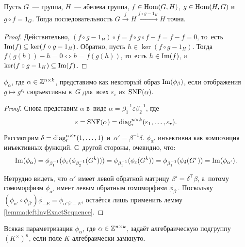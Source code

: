 \documentclass{article}
\begin{document}
\begin{lemma}
\label{lemma:leftInvExactSequence}
    Пусть $G$~— группа, $H$~— абелева группа, $f \in \mathrm{Hom}(G, H)$, $g \in \mathrm{Hom}(H, G)$ и~$g \circ f = 1_G$.
    Тогда последовательность $G \xrightarrow[]{f} H \xrightarrow[]{f \circ g - 1_H} H$ точна.
\end{lemma}

\begin{proof}
    Действительно, $(f \circ g - 1_H) \circ f = f \circ g \circ f - f = f - f = 0$, то~есть $\mathrm{Im}(f) \subseteq \ker(f \circ g - 1_H)$. 
    Обратно, пусть $h \in \ker(f \circ g - 1_H)$. Тогда $f(g(h)) - h = 0 \Leftrightarrow h = f(g(h))$, то~есть $h \in \mathrm{Im}(f)$,
    и~$\ker(f \circ g - 1_H) \subseteq \mathrm{Im}(f)$.
\end{proof}

\begin{lemma}
    $\phi_\alpha$, где $\alpha \in \mathbb{Z}^{n \times k}$, представимо как некоторый образ $\mathrm{Im}(\phi_\beta)$,
    если отображения $g \mapsto g^{\varepsilon_i}$ сюръективны в~$G$ для~всех $\varepsilon_i$ из~$\mathrm{SNF}(\alpha)$.
\end{lemma}

\begin{proof}
    Снова представим $\alpha$ в~виде $\alpha = \beta_1^{-1} \varepsilon \beta_2^{-1}$, где
    $$
        \varepsilon = \mathrm{SNF}(\alpha) = \mathrm{diag}^{n \times k}_r(\varepsilon_1, \ldots, \varepsilon_r).
    $$

    Рассмотрим $\delta = \mathrm{diag}^{n \times r}_r(1, \ldots, 1)$ и~$\alpha' = \beta^{-1} \delta$.
    $\phi_{\alpha'}$ инъективна как композиция инъективных функций. С~другой стороны, очевидно, что:
    $$
        \mathrm{Im}(\phi_\alpha) = \phi_{\beta_1^{-1}} (\phi_\varepsilon (\phi_{\beta_2^{-1}} (G^k)))
                            = \phi_{\beta_1^{-1}} (\phi_\varepsilon (G^k))
                            = \phi_{\beta_1^{-1}} (\phi_{\delta} (G^r))
                            = \mathrm{Im}(\phi_{\alpha'}).
    $$

    Нетрудно видеть, что $\alpha'$ имеет левой обратной матрицу $\beta' = \delta^{\top} \beta$,
    а~потому гомоморфизм $\phi_{\alpha'}$ имеет левым обратным гомоморфизм $\phi_{\beta'}$.
    Поскольку $(\phi_{\alpha'} \circ \phi_{\beta'}) \phi_{-E} = \phi_{\alpha' \beta' - E}$, остаётся лишь применить лемму \ref{lemma:leftInvExactSequence}.
\end{proof}

\begin{theorem}
    Всякая параметризация $\phi_\alpha$, где $\alpha \in \mathbb{Z}^{n \times k}$, задаёт алгебраическую подгруппу $(K^\times)^n$,
    если поле $K$ алгебраически замкнуто.
\end{theorem}
\end{document}
